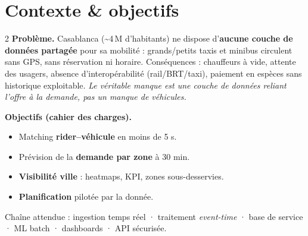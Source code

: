 \documentclass[10pt,a4paper]{article}
\newcommand{\kw}[1]{\textcolor{casablue}{\textbf{#1}}}
\begin{document}
\section{Contexte \& objectifs}
\begin{multicols}{2}
\kw{Problème.} Casablanca (\textasciitilde 4\,M d'habitants) ne dispose
d'\textbf{aucune couche de données partagée} pour sa mobilité : grands/petits
taxis et minibus circulent sans GPS, sans réservation ni horaire. Conséquences :
chauffeurs à vide, attente des usagers, absence d'interopérabilité
(rail/BRT/taxi), paiement en espèces sans historique exploitable. \emph{Le
véritable manque est une couche de données reliant l'offre à la demande, pas un
manque de véhicules.}

\columnbreak

\kw{Objectifs (cahier des charges).}
\begin{itemize}
  \item Matching \textbf{rider–véhicule} en moins de 5 s.
  \item Prévision de la \textbf{demande par zone} à 30 min.
  \item \textbf{Visibilité ville} : heatmaps, KPI, zones sous-desservies.
  \item \textbf{Planification} pilotée par la donnée.
\end{itemize}
Chaîne attendue : ingestion temps réel · traitement \emph{event-time} · base de
service · ML batch · dashboards · API sécurisée.
\end{multicols}

\end{document}
